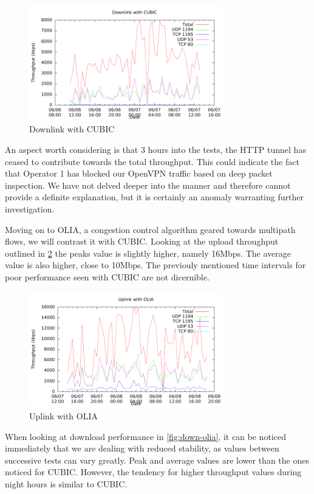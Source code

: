 \begin{figure}[H]
  \centering
  \includegraphics[width=0.75\textwidth]{img/down-cubic}
  \caption{Downlink with CUBIC}
  \label{fig:down-cubic}
\end{figure}

An aspect worth considering is that 3 hours into the tests, the HTTP tunnel
has ceased to contribute towards the total throughput. This could indicate the
fact that Operator 1 has blocked our OpenVPN traffic based on deep packet
inspection. We have not delved deeper into the manner and therefore cannot
provide a definite explanation, but it is certainly an anomaly warranting
further investigation.

Moving on to OLIA, a congestion control algorithm geared towards multipath
flows, we will contrast it with CUBIC. Looking at the upload throughput
outlined in \ref{fig:up-olia} the peaks value is slightly higher, namely
16Mbps. The average value is also higher, close to 10Mbps. The previouly
mentioned time intervals for poor performance seen with CUBIC are not
dicernible.

\begin{figure}[H]
  \centering
  \includegraphics[width=0.75\textwidth]{img/up-olia}
  \caption{Uplink with OLIA}
  \label{fig:up-olia}
\end{figure}

When looking at download performance in \ref{fig:down-olia}, it can be noticed
immediately that we are dealing with reduced stability, as values between
successive tests can vary greatly. Peak and average values are lower than the
ones noticed for CUBIC. However, the tendency for higher throughput values
during night hours is similar to CUBIC.

